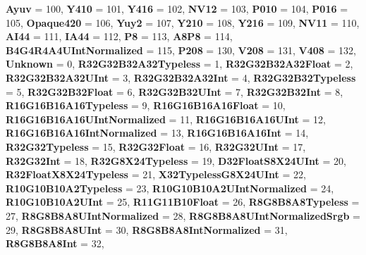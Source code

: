 \begin{DoxyCompactItemize}
\newline
{\bfseries Ayuv} = 100, 
{\bfseries Y410} = 101, 
{\bfseries Y416} = 102, 
{\bfseries N\+V12} = 103, 
\newline
{\bfseries P010} = 104, 
{\bfseries P016} = 105, 
{\bfseries Opaque420} = 106, 
{\bfseries Yuy2} = 107, 
\newline
{\bfseries Y210} = 108, 
{\bfseries Y216} = 109, 
{\bfseries N\+V11} = 110, 
{\bfseries A\+I44} = 111, 
\newline
{\bfseries I\+A44} = 112, 
{\bfseries P8} = 113, 
{\bfseries A8\+P8} = 114, 
{\bfseries B4\+G4\+R4\+A4\+U\+Int\+Normalized} = 115, 
\newline
{\bfseries P208} = 130, 
{\bfseries V208} = 131, 
{\bfseries V408} = 132, 
{\bfseries Unknown} = 0, 
\newline
{\bfseries R32\+G32\+B32\+A32\+Typeless} = 1, 
{\bfseries R32\+G32\+B32\+A32\+Float} = 2, 
{\bfseries R32\+G32\+B32\+A32\+U\+Int} = 3, 
{\bfseries R32\+G32\+B32\+A32\+Int} = 4, 
\newline
{\bfseries R32\+G32\+B32\+Typeless} = 5, 
{\bfseries R32\+G32\+B32\+Float} = 6, 
{\bfseries R32\+G32\+B32\+U\+Int} = 7, 
{\bfseries R32\+G32\+B32\+Int} = 8, 
\newline
{\bfseries R16\+G16\+B16\+A16\+Typeless} = 9, 
{\bfseries R16\+G16\+B16\+A16\+Float} = 10, 
{\bfseries R16\+G16\+B16\+A16\+U\+Int\+Normalized} = 11, 
{\bfseries R16\+G16\+B16\+A16\+U\+Int} = 12, 
\newline
{\bfseries R16\+G16\+B16\+A16\+Int\+Normalized} = 13, 
{\bfseries R16\+G16\+B16\+A16\+Int} = 14, 
{\bfseries R32\+G32\+Typeless} = 15, 
{\bfseries R32\+G32\+Float} = 16, 
\newline
{\bfseries R32\+G32\+U\+Int} = 17, 
{\bfseries R32\+G32\+Int} = 18, 
{\bfseries R32\+G8\+X24\+Typeless} = 19, 
{\bfseries D32\+Float\+S8\+X24\+U\+Int} = 20, 
\newline
{\bfseries R32\+Float\+X8\+X24\+Typeless} = 21, 
{\bfseries X32\+Typeless\+G8\+X24\+U\+Int} = 22, 
{\bfseries R10\+G10\+B10\+A2\+Typeless} = 23, 
{\bfseries R10\+G10\+B10\+A2\+U\+Int\+Normalized} = 24, 
\newline
{\bfseries R10\+G10\+B10\+A2\+U\+Int} = 25, 
{\bfseries R11\+G11\+B10\+Float} = 26, 
{\bfseries R8\+G8\+B8\+A8\+Typeless} = 27, 
{\bfseries R8\+G8\+B8\+A8\+U\+Int\+Normalized} = 28, 
\newline
{\bfseries R8\+G8\+B8\+A8\+U\+Int\+Normalized\+Srgb} = 29, 
{\bfseries R8\+G8\+B8\+A8\+U\+Int} = 30, 
{\bfseries R8\+G8\+B8\+A8\+Int\+Normalized} = 31, 
{\bfseries R8\+G8\+B8\+A8\+Int} = 32, 

\end{DoxyCompactItemize}
